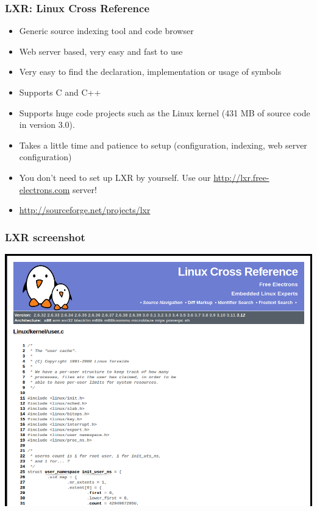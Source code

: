 \begin{frame}
  \frametitle{LXR: Linux Cross Reference}
  \begin{itemize}
  \item Generic source indexing tool and code browser
  \item Web server based, very easy and fast to use
  \item Very easy to find the declaration, implementation or usage
    of symbols
  \item Supports C and C++
  \item Supports huge code projects such as the Linux kernel (431 MB
    of source code in version 3.0).
  \item Takes a little time and patience to setup (configuration,
    indexing, web server configuration)
  \item You don't need to set up LXR by yourself. Use our
    \url{http://lxr.free-electrons.com} server!
  \item \url{http://sourceforge.net/projects/lxr}
  \end{itemize}
\end{frame}

\begin{frame}
  \frametitle{LXR screenshot}
  \begin{center}
    \includegraphics[height=0.8\textheight]{slides/kernel-source-code-management/lxr.png}
  \end{center}
\end{frame}
